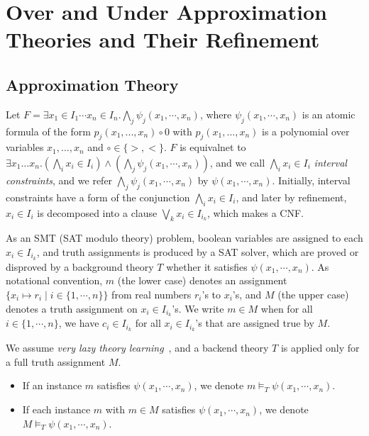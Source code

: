 \documentclass[runningheads,a4paper,oribibl]{llncs}
\begin{document}
\medskip 



\section{Over and Under Approximation Theories and Their Refinement}
\label{sec:raSATloop} 
\subsection{Approximation Theory}

Let 
$F = \exists x_1 \in I_1 \cdots x_n \in I_n. \bigwedge \limits_j \psi_j(x_1,\cdots,x_n)$, 
where $\psi_j(x_1,\cdots,x_n)$ is an atomic formula of the form $p_j(x_1,...,x_n) \circ 0$ with $p_j(x_1,...,x_n)$ is a polynomial over variables $x_1,...,x_n$ and $\circ \in \{>, <\}$. 
%
$F$ is equivalnet to 
$\exists x_1 \ldots x_n. (\bigwedge \limits_i x_i \in I_i) \wedge (\bigwedge \limits_j \psi_j(x_1,\cdots,x_n))$, 
and we call $\bigwedge \limits_i x_i \in I_i$ {\em interval constraints}, and 
we refer $\bigwedge \limits_j \psi_j(x_1,\cdots,x_n)$ by $\psi(x_1,\cdots,x_n)$. 
Initially, interval constraints have a form of the conjunction $\bigwedge \limits_i x_i \in I_i$, 
and later by refinement, $x_i \in I_i$ is decomposed into a clause $\bigvee_k x_i \in I_{i_k}$, 
which makes a CNF. 

As an SMT (SAT modulo theory) problem, 
boolean variables are assigned to each $x_i \in I_{i_k}$, 
and truth assignments is produced by a SAT solver, 
which are proved or disproved by a background theory $T$ whether it satisfies $\psi(x_1,\cdots,x_n)$. 
\sloppy
As notational convention, $m$ (the lower case) denotes 
an assignment $\{x_i \mapsto r_i \mid i \in \{1, \cdots, n\}\}$ from real numbers $r_i$'s to $x_i$'s, and 
$M$ (the upper case) denotes a truth assignment on $x_i \in I_{i_k}$'s. 
We write $m \in M$ when for all $i \in \{1, \cdots, n\}$, we have $c_i \in I_{i_k}$ for all $x_i \in I_{i_k}$'s that are assigned true by $M$. 

We assume {\em very lazy theory learning}~\cite{dpll}, and 
a backend theory $T$ is applied only for a full truth assignment $M$. 
\begin{itemize}
\item If an instance $m$ satisfies $\psi(x_1,\cdots,x_n)$, we denote $m \models_T \psi(x_1,\cdots,x_n)$. 
\item If each instance $m$ with $m \in M$ satisfies $\psi(x_1,\cdots,x_n)$, 
we denote $M \models_T \psi(x_1,\cdots,x_n)$. 
\end{itemize}
\end{document}
